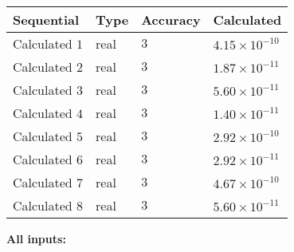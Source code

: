 \documentclass[12pt]{article}
\begin{document}
   
   
   
\noindent{}
   
   
  
  
\noindent\begin{tabular}{|l|l|l|l|}
\hline
 Sequential & Type & Accuracy & Calculated \\ 
\hline
 
 
  Calculated $            1 $ & real & $            3  $ & 
 $ 4.15 \times 10^{-10} $ 
 \\  \hline  
 
 
  Calculated $            2 $ & real & $            3  $ & 
 $ 1.87 \times 10^{-11} $ 
 \\  \hline  
 
 
  Calculated $            3 $ & real & $            3  $ & 
 $ 5.60 \times 10^{-11} $ 
 \\  \hline  
 
 
  Calculated $            4 $ & real & $            3  $ & 
 $ 1.40 \times 10^{-11} $ 
 \\  \hline  
 
 
  Calculated $            5 $ & real & $            3  $ & 
 $ 2.92 \times 10^{-10} $ 
 \\  \hline  
 
 
  Calculated $            6 $ & real & $            3  $ & 
 $ 2.92 \times 10^{-11} $ 
 \\  \hline  
 
 
  Calculated $            7 $ & real & $            3  $ & 
 $ 4.67 \times 10^{-10} $ 
 \\  \hline  
 
 
  Calculated $            8 $ & real & $            3  $ & 
 $ 5.60 \times 10^{-11} $ 
 \\  \hline  
 \end{tabular}
   
   
   
   
\noindent\vspace{0.1in}\hspace{-0.08in} {\textbf{\Large{All inputs: }}}
   
   
  
\end{document}
